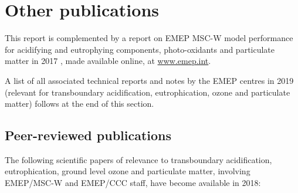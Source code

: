 \section{Other publications}
\label{sec:publ}
This report is complemented by a report on EMEP MSC-W model performance for acidifying and eutrophying components, photo-oxidants and particulate matter in 2017 \citep{WEB2019:Eval}, made available online, at \url{www.emep.int}.



A list of all associated technical reports and notes  by the EMEP
centres in 2019 (relevant for transboundary acidification, eutrophication,
ozone and particulate matter) follows at the end of this section.

\subsection*{Peer-reviewed publications}

The following scientific papers of relevance to transboundary acidification, eutrophication, ground level ozone and particulate matter, involving EMEP/MSC-W and EMEP/CCC staff, have become available in 2018:

